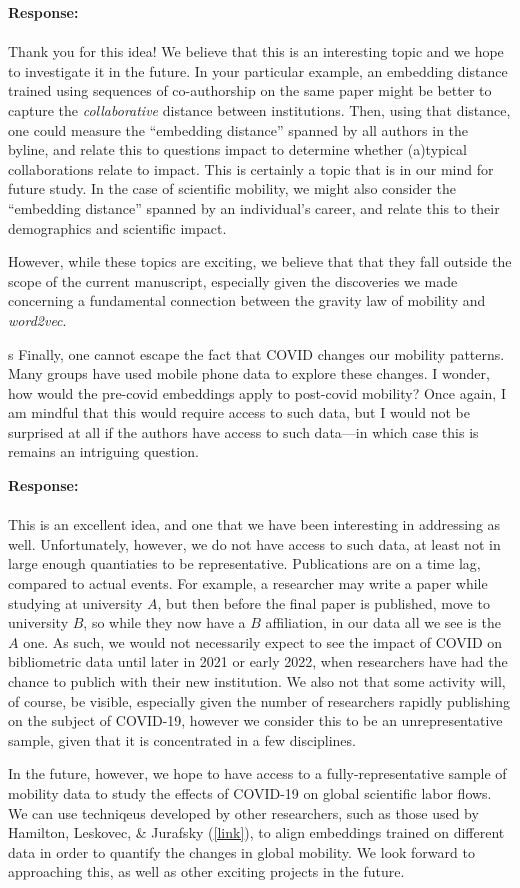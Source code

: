 \documentclass[12pt,a4paper]{article}
\newcommand{\response}[1]{{\noindent \textbf{Response:} \\ \\ \noindent #1}}
\newcommand{\rcomment}[1]{%
\vspace{10pt}
\begin{sectionbox}
s #1
\end{sectionbox}
}
\begin{document}
\response{Thank you for this idea!
	We believe that this is an interesting topic and we hope to investigate it in the future.
	In your particular example, an embedding distance trained using sequences of co-authorship on the same paper might be better to capture the \textit{collaborative} distance between institutions.
	Then, using that distance, one could measure the ``embedding distance'' spanned by all authors in the byline, and relate this to questions impact to determine whether (a)typical collaborations relate to impact.
	This is certainly a topic that is in our mind for future study.
	In the case of scientific mobility, we might also consider the ``embedding distance'' spanned by an individual's career, and relate this to their demographics and scientific impact.

	However, while these topics are exciting, we believe that that they fall outside the scope of the current manuscript, especially given the discoveries we made concerning a fundamental connection between the gravity law of mobility and \textit{word2vec}.
}


\rcomment{
	Finally, one cannot escape the fact that COVID changes our mobility patterns. Many groups have used mobile phone data to explore these changes. I wonder, how would the pre-covid embeddings apply to post-covid mobility? Once again, I am mindful that this would require access to such data, but I would not be surprised at all if the authors have access to such data—in which case this is remains an intriguing question.
}

\response{This is an excellent idea, and one that we have been interesting in addressing as well.
	Unfortunately, however, we do not have access to such data, at least not in large enough quantiaties to be representative.
	Publications are on a time lag, compared to actual events.
	For example, a researcher may write a paper while studying at university $A$, but then before the final paper is published, move to university $B$, so while they now have a $B$ affiliation, in our data all we see is the $A$ one.
	As such, we would not necessarily expect to  see the impact of COVID on bibliometric data until later in 2021 or early 2022, when researchers have had the chance to publich with their new institution.
	We also not that some activity will, of course, be visible, especially given the number of researchers rapidly publishing on the subject of COVID-19, however we consider this to be an unrepresentative sample, given that it is concentrated in a few disciplines.

	In the future, however, we hope to have access to a fully-representative sample of mobility data to study the effects of COVID-19 on global scientific labor flows.
	We can use techniqeus developed by other researchers, such as those used by Hamilton, Leskovec, \& Jurafsky (\href{https://nlp.stanford.edu/projects/histwords/}{[link]}), to align embeddings trained on different data in order to quantify the changes in global mobility.
	We look forward to approaching this, as well as other exciting projects in the future.
}
\end{document}
